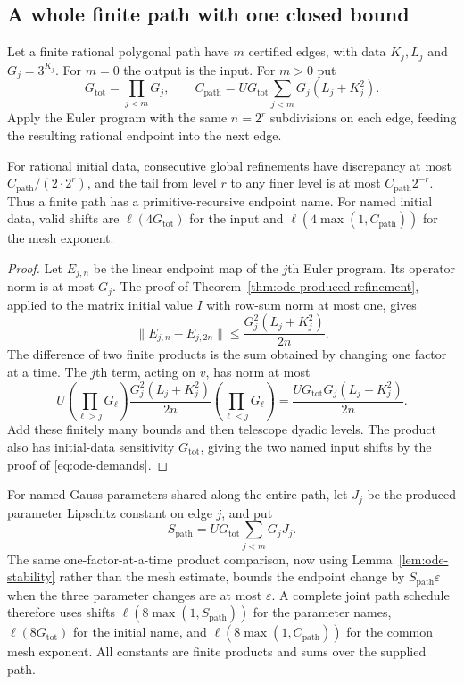 \subsection{A whole finite path with one closed bound}

Let a finite rational polygonal path have $m$ certified edges, with data
$K_j,L_j$ and $G_j=3^{K_j}$. For $m=0$ the output is the input. For $m>0$
put
\begin{equation}\label{eq:ode-path-constants}
 G_{\mathrm{tot}}=\prod_{j<m}G_j,\qquad
 C_{\mathrm{path}}=
 U G_{\mathrm{tot}}\sum_{j<m}G_j(L_j+K_j^2).
\end{equation}
Apply the Euler program with the same $n=2^r$ subdivisions on each edge,
feeding the resulting rational endpoint into the next edge.

\begin{theorem}\label{thm:ode-path-name}
For rational initial data, consecutive global refinements have discrepancy
at most $C_{\mathrm{path}}/(2\cdot2^r)$, and the tail from level $r$ to any
finer level is at most $C_{\mathrm{path}}2^{-r}$. Thus a finite path has a
primitive-recursive endpoint name. For named initial data, valid shifts are
$\ell(4G_{\mathrm{tot}})$ for the input and
$\ell(4\max(1,C_{\mathrm{path}}))$ for the mesh exponent.
\end{theorem}
\begin{proof}
Let $E_{j,n}$ be the linear endpoint map of the $j$th Euler program.
Its operator norm is at most $G_j$. The proof of
Theorem~\ref{thm:ode-produced-refinement}, applied to the matrix initial value $I$ with row-sum norm at most one, gives
\[
 \lVert E_{j,n}-E_{j,2n}\rVert
 \le\frac{G_j^2(L_j+K_j^2)}{2n}.
\]
The difference of two finite products is the sum obtained by changing one
factor at a time. The $j$th term, acting on $v$, has norm at most
\[
 U\left(\prod_{\ell>j}G_\ell\right)
 \frac{G_j^2(L_j+K_j^2)}{2n}
 \left(\prod_{\ell<j}G_\ell\right)
 =\frac{UG_{\mathrm{tot}}G_j(L_j+K_j^2)}{2n}.
\]
Add these finitely many bounds and then telescope dyadic levels. The product
also has initial-data sensitivity $G_{\mathrm{tot}}$, giving the two named
input shifts by the proof of \eqref{eq:ode-demands}.
\end{proof}

For named Gauss parameters shared along the entire path, let $J_j$ be the
produced parameter Lipschitz constant on edge $j$, and put
\[
 S_{\mathrm{path}}=UG_{\mathrm{tot}}\sum_{j<m}G_jJ_j.
\]
The same one-factor-at-a-time product comparison, now using
Lemma~\ref{lem:ode-stability} rather than the mesh estimate, bounds the
endpoint change by $S_{\mathrm{path}}\varepsilon$ when the three parameter
changes are at most $\varepsilon$. A complete joint path schedule therefore
uses shifts $\ell(8\max(1,S_{\mathrm{path}}))$ for the parameter names,
$\ell(8G_{\mathrm{tot}})$ for the initial name, and
$\ell(8\max(1,C_{\mathrm{path}}))$ for the common mesh exponent. All constants
are finite products and sums over the supplied path.

